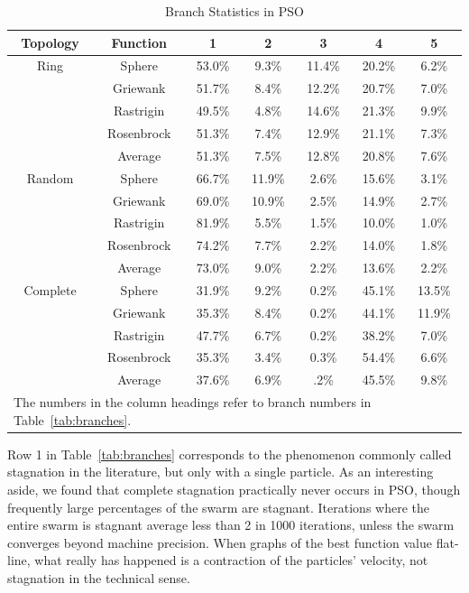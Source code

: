 \documentclass[journal,letterpaper]{IEEEtran}
\begin{document}
\begin{table}[ht]
  \caption{Branch Statistics in PSO}
  \label{tab:stats}
  \centering
  \begin{tabular}{c|c|c|c|c|c|c}
	Topology&Function&1&2&3&4&5\\
	\hline
	\hline
	Ring&Sphere&53.0\%&9.3\%&11.4\%&20.2\%&6.2\%\\
	&Griewank&51.7\%&8.4\%&12.2\%&20.7\%&7.0\%\\
	&Rastrigin&49.5\%&4.8\%&14.6\%&21.3\%&9.9\%\\
	&Rosenbrock&51.3\%&7.4\%&12.9\%&21.1\%&7.3\%\\
	\cline{2-7}
	&Average&{51.3\%}&{7.5\%}&{12.8\%}&{20.8\%}&
	{7.6\%}\\
	\hline
	\hline
	Random&Sphere&66.7\%&11.9\%&2.6\%&15.6\%&3.1\%\\
	&Griewank&69.0\%&10.9\%&2.5\%&14.9\%&2.7\%\\
	&Rastrigin&81.9\%&5.5\%&1.5\%&10.0\%&1.0\%\\
	&Rosenbrock&74.2\%&7.7\%&2.2\%&14.0\%&1.8\%\\
	\cline{2-7}
	&Average&{73.0\%}&{9.0\%}&{2.2\%}&{13.6\%}&
	{2.2\%}\\
	\hline
	\hline
	Complete&Sphere&31.9\%&9.2\%&0.2\%&45.1\%&13.5\%\\
	&Griewank&35.3\%&8.4\%&0.2\%&44.1\%&11.9\%\\
	&Rastrigin&47.7\%&6.7\%&0.2\%&38.2\%&7.0\%\\
	&Rosenbrock&35.3\%&3.4\%&0.3\%&54.4\%&6.6\%\\
	\cline{2-7}
	&Average&{37.6\%}&{6.9\%}&{.2\%}&{45.5\%}&
	{9.8\%}\\
	\hline
	\multicolumn{7}{l}{The numbers in the column headings refer to branch
	numbers in Table~\ref{tab:branches}.}
  \end{tabular}
\end{table}

Row 1 in Table~\ref{tab:branches} corresponds to the phenomenon commonly called
stagnation in the literature, but only with a single particle.  As an
interesting aside, we found that complete stagnation practically never occurs
in PSO, though frequently large percentages of the swarm are stagnant.
Iterations where the entire swarm is stagnant average less than 2 in 1000
iterations, unless the swarm converges beyond machine precision.  When graphs
of the best function value flat-line, what really has happened is a contraction
of the particles' velocity, not stagnation in the technical sense.  
\end{document}
